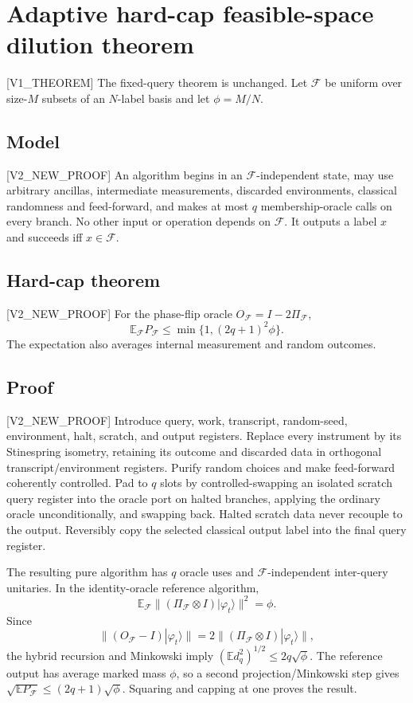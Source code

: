 \documentclass{article}
\newcommand{\F}{\mathcal F}
\newcommand{\tagclaim}[1]{\textsf{[#1]}}
\begin{document}
\section*{Adaptive hard-cap feasible-space dilution theorem}

\tagclaim{V1\_THEOREM} The fixed-query theorem is unchanged. Let $\F$ be
uniform over size-$M$ subsets of an $N$-label basis and let $\phi=M/N$.

\subsection*{Model}
\tagclaim{V2\_NEW\_PROOF} An algorithm begins in an $\F$-independent state,
may use arbitrary ancillas, intermediate measurements, discarded environments,
classical randomness and feed-forward, and makes at most $q$ membership-oracle
calls on every branch. No other input or operation depends on $\F$. It outputs
a label $x$ and succeeds iff $x\in\F$.

\subsection*{Hard-cap theorem}
\tagclaim{V2\_NEW\_PROOF} For the phase-flip oracle
$O_\F=I-2\Pi_\F$,
\[
 \mathbb E_\F P_\F\le \min\{1,(2q+1)^2\phi\}.
\]
The expectation also averages internal measurement and random outcomes.

\subsection*{Proof}
\tagclaim{V2\_NEW\_PROOF} Introduce query, work, transcript, random-seed,
environment, halt, scratch, and output registers. Replace every instrument by
its Stinespring isometry, retaining its outcome and discarded data in
orthogonal transcript/environment registers. Purify random choices and make
feed-forward coherently controlled. Pad to $q$ slots by controlled-swapping an
isolated scratch query register into the oracle port on halted branches,
applying the ordinary oracle unconditionally, and swapping back. Halted scratch
data never recouple to the output. Reversibly copy the selected classical output
label into the final query register.

The resulting pure algorithm has $q$ oracle uses and $\F$-independent
inter-query unitaries. In the identity-oracle reference algorithm,
\[
 \mathbb E_\F\|(\Pi_\F\otimes I)|\varphi_t\rangle\|^2=\phi.
\]
Since
\[
 \|(O_\F-I)|\varphi_t\rangle\|
 =2\|(\Pi_\F\otimes I)|\varphi_t\rangle\|,
\]
the hybrid recursion and Minkowski imply
$(\mathbb E d_q^2)^{1/2}\le2q\sqrt\phi$. The reference output has average
marked mass $\phi$, so a second projection/Minkowski step gives
$\sqrt{\mathbb E P_\F}\le(2q+1)\sqrt\phi$. Squaring and capping at one proves
the result.
\end{document}
